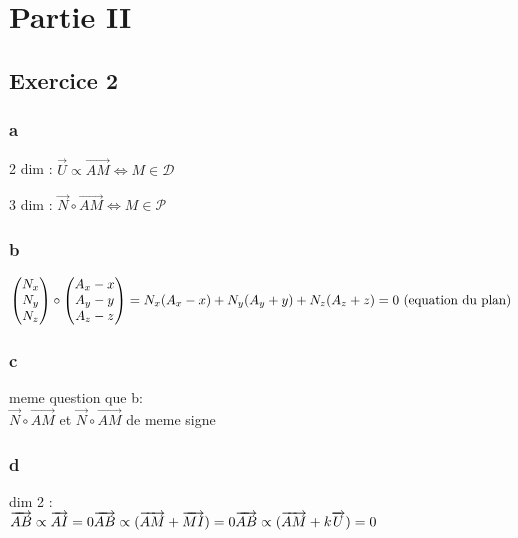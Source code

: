 \documentclass[a4paper]{article}
\begin{document}
\section{Partie II}
\subsection{Exercice 2}
\subsubsection{a}
\begin{description}
\item 2 dim : $\overrightarrow{U} \propto \overrightarrow{AM} \Leftrightarrow M \in \mathcal{D}$
\item 3 dim : $\overrightarrow{N} \circ \overrightarrow{AM} \Leftrightarrow M \in \mathcal{P}$
\end{description}
\subsubsection{b}
\begin{math}
\begin{pmatrix}
  N_x\\
  N_y\\
  N_z
\end{pmatrix}
\circ
\begin{pmatrix}
  A_x - x\\
  A_y - y\\
  A_z - z
\end{pmatrix}
= N_x(A_x -x) + N_y(A_y + y) + N_z(A_z + z) = 0 $  (equation du plan)$
\end{math}
\subsubsection{c}
meme question que b: \\
$\overrightarrow{N} \circ \overrightarrow{AM}$ et $\overrightarrow{N} \circ \overrightarrow{AM}$ de meme signe
\subsubsection{d}
dim 2 : \\
\begin{math}
\overrightarrow{AB} \propto \overrightarrow{AI} = 0\\
\overrightarrow{AB} \propto (\overrightarrow{AM} + \overrightarrow{MI}) = 0\\
\overrightarrow{AB} \propto (\overrightarrow{AM} + k\overrightarrow{U}) = 0
\end{math}
\end{document}
